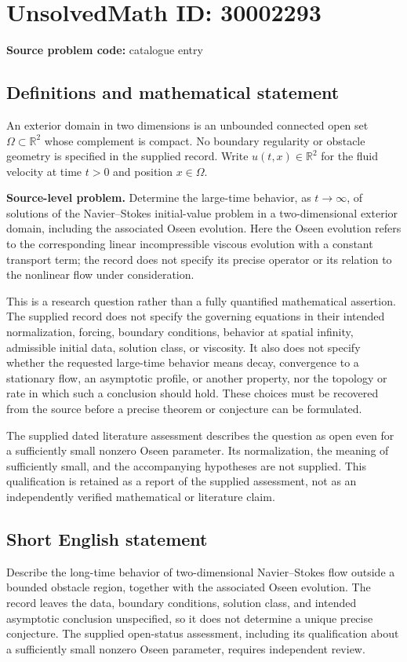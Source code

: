 \documentclass[11pt]{article}
\newcommand{\R}{\mathbb{R}}
\begin{document}
\section*{UnsolvedMath ID: 30002293}
\textbf{Source problem code:} catalogue entry
\subsection{Definitions and mathematical statement}
An exterior domain in two dimensions is an unbounded connected open set \(\Omega\subset\R^2\) whose complement is compact. No boundary regularity or obstacle geometry is specified in the supplied record. Write \(u(t,x)\in\R^2\) for the fluid velocity at time \(t>0\) and position \(x\in\Omega\).

\textbf{Source-level problem.} Determine the large-time behavior, as \(t\to\infty\), of solutions of the Navier--Stokes initial-value problem in a two-dimensional exterior domain, including the associated Oseen evolution. Here the Oseen evolution refers to the corresponding linear incompressible viscous evolution with a constant transport term; the record does not specify its precise operator or its relation to the nonlinear flow under consideration.

This is a research question rather than a fully quantified mathematical assertion. The supplied record does not specify the governing equations in their intended normalization, forcing, boundary conditions, behavior at spatial infinity, admissible initial data, solution class, or viscosity. It also does not specify whether the requested large-time behavior means decay, convergence to a stationary flow, an asymptotic profile, or another property, nor the topology or rate in which such a conclusion should hold. These choices must be recovered from the source before a precise theorem or conjecture can be formulated.

The supplied dated literature assessment describes the question as open even for a sufficiently small nonzero Oseen parameter. Its normalization, the meaning of sufficiently small, and the accompanying hypotheses are not supplied. This qualification is retained as a report of the supplied assessment, not as an independently verified mathematical or literature claim.
\subsection{Short English statement}
Describe the long-time behavior of two-dimensional Navier--Stokes flow outside a bounded obstacle region, together with the associated Oseen evolution. The record leaves the data, boundary conditions, solution class, and intended asymptotic conclusion unspecified, so it does not determine a unique precise conjecture. The supplied open-status assessment, including its qualification about a sufficiently small nonzero Oseen parameter, requires independent review.
\end{document}
